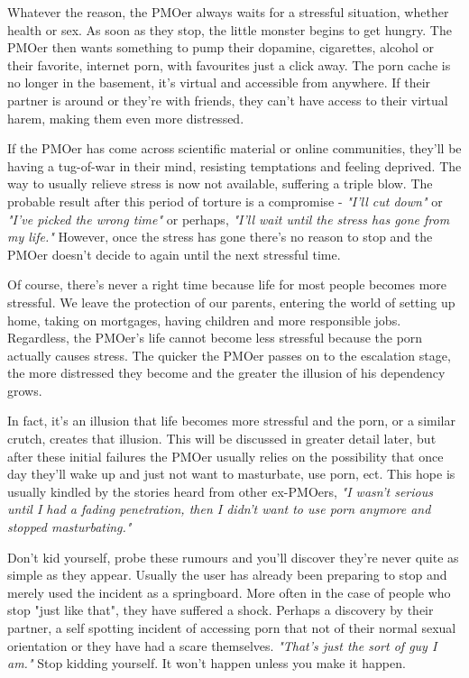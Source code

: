 \documentclass[easypeasy.tex]{subfiles}
\begin{document}
Whatever the reason, the PMOer always waits for a stressful situation, whether health or sex. As soon as they stop, the little monster begins to get hungry. The PMOer then wants something to pump their dopamine, cigarettes, alcohol or their favorite, internet porn, with favourites just a click away. The porn cache is no longer in the basement, it's virtual and accessible from anywhere. If their partner is around or they're with friends, they can't have access to their virtual harem, making them even more distressed.

If the PMOer has come across scientific material or online communities, they'll be having a tug-of-war in their mind, resisting temptations and feeling deprived. The way to usually relieve stress is now not available, suffering a triple blow. The probable result after this period of torture is a compromise - \textit{"I'll cut down"} or \textit{"I've picked the wrong time"} or perhaps, \textit{"I'll wait until the stress has gone from my life."} However, once the stress has gone there's no reason to stop and the PMOer doesn't decide to again until the next stressful time.

Of course, there's never a right time because life for most people becomes more stressful. We leave the protection of our parents, entering the world of setting up home, taking on mortgages, having children and more responsible jobs. Regardless, the PMOer's life cannot become less stressful because the porn actually causes stress. The quicker the PMOer passes on to the escalation stage, the more distressed they become and the greater the illusion of his dependency grows.

In fact, it's an illusion that life becomes more stressful and the porn, or a similar crutch, creates that illusion. This will be discussed in greater detail later, but after these initial failures the PMOer usually relies on the possibility that once day they'll wake up and just not want to masturbate, use porn, ect. This hope is usually kindled by the stories heard from other ex-PMOers, \textit{"I wasn't serious until I had a fading penetration, then I didn't want to use porn anymore and stopped masturbating."}

Don't kid yourself, probe these rumours and you'll discover they're never quite as simple as they appear. Usually the user has already been preparing to stop and merely used the incident as a springboard. More often in the case of people who stop "just like that", they have suffered a shock. Perhaps a discovery by their partner, a self spotting incident of accessing porn that not of their normal sexual orientation or they have had a scare themselves. \textit{"That's just the sort of guy I am."} Stop kidding yourself. It won't happen unless you make it happen.
\end{document}
